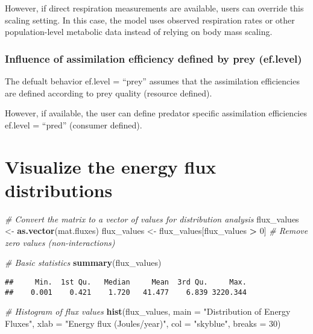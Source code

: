 \documentclass[
]{article}
\newenvironment{Shaded}{\begin{snugshade}}{\end{snugshade}}
\newcommand{\AttributeTok}[1]{\textcolor[rgb]{0.13,0.29,0.53}{#1}}
\newcommand{\CommentTok}[1]{\textcolor[rgb]{0.56,0.35,0.01}{\textit{#1}}}
\newcommand{\DecValTok}[1]{\textcolor[rgb]{0.00,0.00,0.81}{#1}}
\newcommand{\FunctionTok}[1]{\textcolor[rgb]{0.13,0.29,0.53}{\textbf{#1}}}
\newcommand{\NormalTok}[1]{#1}
\newcommand{\OtherTok}[1]{\textcolor[rgb]{0.56,0.35,0.01}{#1}}
\newcommand{\SpecialCharTok}[1]{\textcolor[rgb]{0.81,0.36,0.00}{\textbf{#1}}}
\newcommand{\StringTok}[1]{\textcolor[rgb]{0.31,0.60,0.02}{#1}}
\begin{document}
However, if direct respiration measurements are available, users can
override this scaling setting. In this case, the model uses observed
respiration rates or other population-level metabolic data instead of
relying on body mass scaling.

\subsubsection{Influence of assimilation efficiency defined by prey
(ef.level)}\label{influence-of-assimilation-efficiency-defined-by-prey-ef.level}

The defualt behavior ef.level = ``prey'' assumes that the assimilation
efficiencies are defined according to prey quality (resource defined).

However, if available, the user can define predator specific
assimilation efficiencies ef.level = ``pred'' (consumer defined).

\section{Visualize the energy flux
distributions}\label{visualize-the-energy-flux-distributions}

\begin{Shaded}
\begin{Highlighting}[]
\CommentTok{\# Convert the matrix to a vector of values for distribution analysis}
\NormalTok{flux\_values }\OtherTok{\textless{}{-}} \FunctionTok{as.vector}\NormalTok{(mat.fluxes)}
\NormalTok{flux\_values }\OtherTok{\textless{}{-}}\NormalTok{ flux\_values[flux\_values }\SpecialCharTok{\textgreater{}} \DecValTok{0}\NormalTok{]  }\CommentTok{\# Remove zero values (non{-}interactions)}

\CommentTok{\# Basic statistics}
\FunctionTok{summary}\NormalTok{(flux\_values)}
\end{Highlighting}
\end{Shaded}

\begin{verbatim}
##     Min.  1st Qu.   Median     Mean  3rd Qu.     Max. 
##    0.001    0.421    1.720   41.477    6.839 3220.344
\end{verbatim}

\begin{Shaded}
\begin{Highlighting}[]
\CommentTok{\# Histogram of flux values}
\FunctionTok{hist}\NormalTok{(flux\_values, }
     \AttributeTok{main =} \StringTok{"Distribution of Energy Fluxes"}\NormalTok{, }
     \AttributeTok{xlab =} \StringTok{"Energy flux (Joules/year)"}\NormalTok{,}
     \AttributeTok{col =} \StringTok{"skyblue"}\NormalTok{,}
     \AttributeTok{breaks =} \DecValTok{30}\NormalTok{)}
\end{Highlighting}
\end{Shaded}
\end{document}

